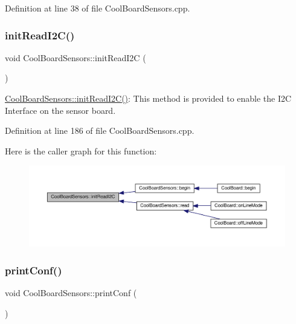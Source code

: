 Definition at line 38 of file Cool\+Board\+Sensors.\+cpp.

\mbox{\label{class_cool_board_sensors_acad6a8418c66d36868caca23c844ecb6}} 
\subsubsection{\texorpdfstring{init\+Read\+I2\+C()}{initReadI2C()}}
{\footnotesize\ttfamily void Cool\+Board\+Sensors\+::init\+Read\+I2C (\begin{DoxyParamCaption}{ }\end{DoxyParamCaption})}

\hyperlink{class_cool_board_sensors_acad6a8418c66d36868caca23c844ecb6}{Cool\+Board\+Sensors\+::init\+Read\+I2\+C()}\+: This method is provided to enable the I2C Interface on the sensor board. 

Definition at line 186 of file Cool\+Board\+Sensors.\+cpp.

Here is the caller graph for this function\+:\nopagebreak
\begin{figure}[H]
\begin{center}
\leavevmode
\includegraphics[width=350pt]{class_cool_board_sensors_acad6a8418c66d36868caca23c844ecb6_icgraph}
\end{center}
\end{figure}
\mbox{\label{class_cool_board_sensors_af6fd79505815b204c178617ecf54c873}} 
\subsubsection{\texorpdfstring{print\+Conf()}{printConf()}}
{\footnotesize\ttfamily void Cool\+Board\+Sensors\+::print\+Conf (\begin{DoxyParamCaption}{ }\end{DoxyParamCaption})}

